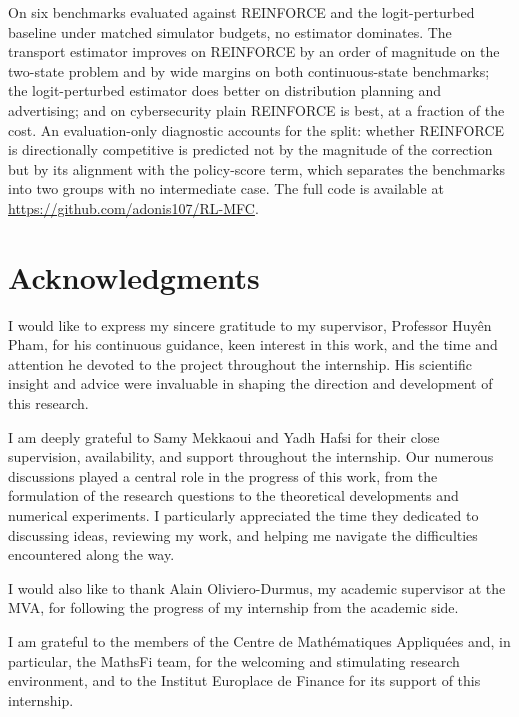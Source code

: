 \documentclass[11pt]{report}
\begin{document}
On six benchmarks evaluated against REINFORCE and the logit-perturbed baseline under matched simulator budgets, no estimator dominates. The transport estimator improves on REINFORCE by an order of magnitude on the two-state problem and by wide margins on both continuous-state benchmarks; the logit-perturbed estimator does better on distribution planning and advertising; and on cybersecurity plain REINFORCE is best, at a fraction of the cost. An evaluation-only diagnostic accounts for the split: whether REINFORCE is directionally competitive is predicted not by the magnitude of the correction but by its alignment with the policy-score term, which separates the benchmarks into two groups with no intermediate case. The full code is available at \url{https://github.com/adonis107/RL-MFC}.


\section*{Acknowledgments}

I would like to express my sincere gratitude to my supervisor, Professor Huyên Pham, for his continuous guidance, keen interest in this work, and the time and attention he devoted to the project throughout the internship. His scientific insight and advice were invaluable in shaping the direction and development of this research.

I am deeply grateful to Samy Mekkaoui and Yadh Hafsi for their close supervision, availability, and support throughout the internship. Our numerous discussions played a central role in the progress of this work, from the formulation of the research questions to the theoretical developments and numerical experiments. I particularly appreciated the time they dedicated to discussing ideas, reviewing my work, and helping me navigate the difficulties encountered along the way.

I would also like to thank Alain Oliviero-Durmus, my academic supervisor at the MVA, for following the progress of my internship from the academic side.

I am grateful to the members of the Centre de Mathématiques Appliquées and, in particular, the MathsFi team, for the welcoming and stimulating research environment, and to the Institut Europlace de Finance for its support of this internship.
\end{document}
